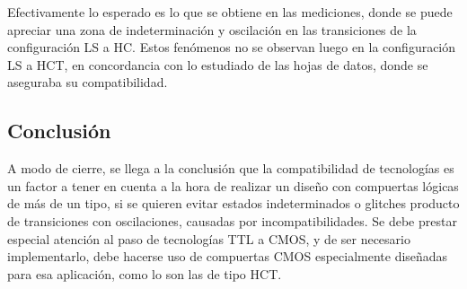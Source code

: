 Efectivamente lo esperado es lo que se obtiene en las mediciones, donde se puede apreciar una zona de indeterminación y oscilación en las transiciones de la configuración 
LS a HC.
Estos fenómenos no se observan luego en la configuración LS a HCT, en concordancia con lo estudiado de las hojas de datos, donde se aseguraba su compatibilidad.



\subsection{Conclusi\'on}
A modo de cierre, se llega a la conclusión que la compatibilidad de tecnologías es un factor a tener en cuenta a la hora de realizar un diseño con compuertas lógicas de 
más de un tipo, si se quieren evitar estados indeterminados o glitches producto de transiciones con oscilaciones, causadas por incompatibilidades.
Se debe prestar especial atención al paso de tecnologías TTL a CMOS, y de ser necesario implementarlo, debe hacerse uso de compuertas CMOS especialmente diseñadas para 
esa aplicación, como lo son las de tipo HCT.
